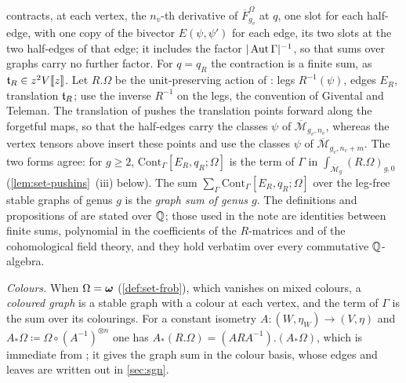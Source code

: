 \begin{defn}
contracts, at each vertex, the $n_v$-th derivative of $\overline F^\Omega_{g_v}$ at $q$, one slot for each half-edge, with one copy of the bivector $E(\psi,\psi')$ for each edge, its two slots at the two half-edges of that edge; it includes the factor $|\operatorname{Aut}\Gamma|^{-1}$, so that sums over graphs carry no further factor. For $q=q_R$ the contraction is a finite sum, as $\mathfrak{t}_R\in z^2V[\![ z ]\!]$. Let $R.\Omega$ be the unit-preserving action of \cite[Defs.~2.2, 2.5, 2.13]{PPZ15}: legs $R^{-1}(\psi)$, edges $E_R$, translation $\mathfrak{t}_R$; \cite[p.~20]{PPZ15} use the inverse $R^{-1}$ on the legs, the convention of Givental and Teleman. The translation of \cite[Def.~2.5]{PPZ15} pushes the translation points forward along the forgetful maps, so that the half-edges carry the classes $\psi$ of $\overline{\mathcal M}_{g_v,n_v}$, whereas the vertex tensors above insert these points and use the classes $\psi$ of $\overline{\mathcal M}_{g_v,n_v+m}$. The two forms agree: for $g\geq2$, $\mathrm{Cont}_\Gamma[E_R,q_R;\Omega]$ is the term of $\Gamma$ in $\int_{\overline{\mathcal M}_g}(R.\Omega)_{g,0}$ (\cref{lem:set-pushins}~(iii) below). The sum $\sum_\Gamma\mathrm{Cont}_\Gamma[E_R,q_R;\Omega]$ over the leg-free stable graphs of genus $g$ is the \emph{graph sum of genus $g$}. The definitions and propositions of \cite{PPZ15} are stated over $\mathbb{Q}$; those used in the note are identities between finite sums, polynomial in the coefficients of the $R$-matrices and of the cohomological field theory, and they hold verbatim over every commutative $\mathbb{Q}$-algebra.

\emph{Colours.} When $\Omega=\boldsymbol{\omega}$ (\cref{def:set-frob}), which vanishes on mixed colours, a \emph{coloured graph} is a stable graph with a colour at each vertex, and the term of $\Gamma$ is the sum over its colourings. For a constant isometry $A\colon(W,\eta_W)\to(V,\eta)$ and $A_*\Omega\coloneqq\Omega\circ(A^{-1})^{\otimes n}$ one has $A_*(R.\Omega)=(ARA^{-1}).(A_*\Omega)$, which is immediate from \cite[Defs.~2.2, 2.13]{PPZ15}; it gives the graph sum in the colour basis, whose edges and leaves are written out in \cref{sec:sgn}.
\end{defn}

